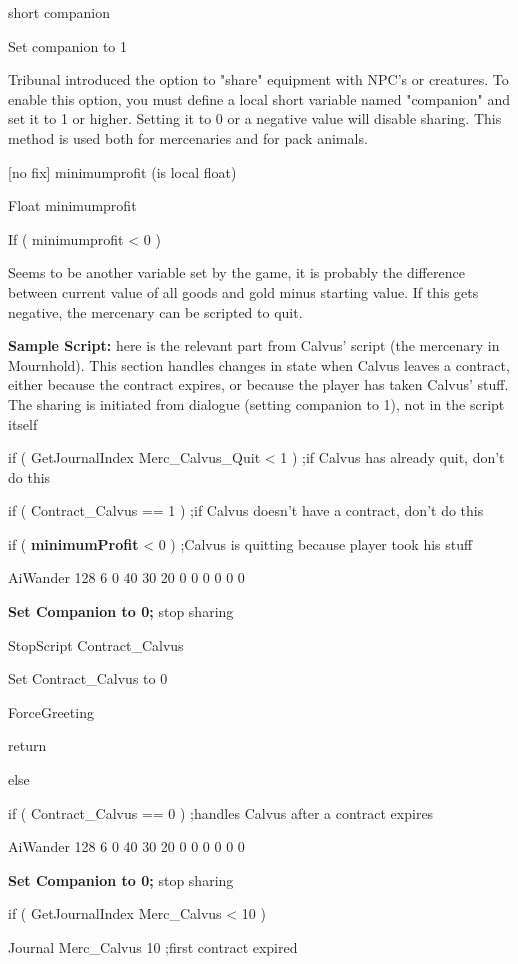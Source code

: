 short companion

Set companion to 1

Tribunal introduced the option to "share" equipment with NPC's or
creatures. To enable this option, you must define a local short variable
named "companion" and set it to 1 or higher. Setting it to 0 or a
negative value will disable sharing. This method is used both for
mercenaries and for pack animals.

{[}no fix{]} minimumprofit (is local float)

Float minimumprofit

If ( minimumprofit \textless{} 0 )

Seems to be another variable set by the game, it is probably the
difference between current value of all goods and gold minus starting
value. If this gets negative, the mercenary can be scripted to quit.

\textbf{Sample Script:} here is the relevant part from Calvus' script
(the mercenary in Mournhold). This section handles changes in state when
Calvus leaves a contract, either because the contract expires, or
because the player has taken Calvus' stuff. The sharing is initiated
from dialogue (setting companion to 1), not in the script itself

if ( GetJournalIndex Merc\_Calvus\_Quit \textless{} 1 ) ;if Calvus has
already quit, don't do this

if ( Contract\_Calvus == 1 ) ;if Calvus doesn't have a contract, don't
do this

if ( \textbf{minimumProfit} \textless{} 0 ) ;Calvus is quitting because
player took his stuff

AiWander 128 6 0 40 30 20 0 0 0 0 0 0

\textbf{Set Companion to 0;} stop sharing

StopScript Contract\_Calvus

Set Contract\_Calvus to 0

ForceGreeting

return

else

if ( Contract\_Calvus == 0 ) ;handles Calvus after a contract expires

AiWander 128 6 0 40 30 20 0 0 0 0 0 0

\textbf{Set Companion to 0;} stop sharing

if ( GetJournalIndex Merc\_Calvus \textless{} 10 )

Journal Merc\_Calvus 10 ;first contract expired

